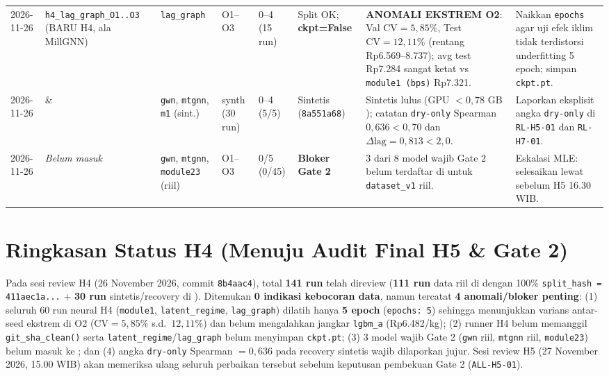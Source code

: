 \documentclass[11pt,a4paper]{article}
\begin{document}
\begin{longtable}{@{}C{1.3cm}L{2.5cm}L{1.4cm}C{0.9cm}C{0.9cm}L{1.4cm}L{3.2cm}L{2.5cm}@{}}
2026-11-26 & \texttt{h4\_lag\_graph\_O1..O3} (BARU H4, ala MillGNN) & \texttt{lag\_graph} & O1--O3 & 0--4 (15 run) & Split OK; \textbf{ckpt=False} & \textbf{ANOMALI EKSTREM O2}: Val $\text{CV}=5{,}85\%$, Test $\text{CV}=12{,}11\%$ (rentang Rp6.569--8.737); avg test Rp7.284 sangat ketat vs \texttt{module1 (bps)} Rp7.321. & Naikkan \texttt{epochs} agar uji efek iklim tidak terdistorsi underfitting 5 epoch; simpan \texttt{ckpt.pt}. \\
2026-11-26 &  \&  & \texttt{gwn}, \texttt{mtgnn}, \texttt{m1} (sint.) & synth (30 run) & 0--4 (5/5) & Sintetis (\texttt{8a551a68}) & Sintetis lulus (GPU $<0{,}78\text{ GB}$); catatan \texttt{dry-only} Spearman $0{,}636 < 0{,}70$ dan $\Delta\text{lag}=0{,}813 < 2{,}0$. & Laporkan eksplisit angka \texttt{dry-only} di \texttt{RL-H5-01} dan \texttt{RL-H7-01}. \\
2026-11-26 & \textit{Belum masuk } & \texttt{gwn}, \texttt{mtgnn}, \texttt{module23} (riil) & O1--O3 & 0/5 (0/45) & \textbf{Bloker Gate 2} & 3 dari 8 model wajib Gate 2 belum terdaftar di  untuk \texttt{dataset\_v1} riil. & Eskalasi MLE: selesaikan lewat  sebelum H5 16.30 WIB. \\
\bottomrule
\end{longtable}
\endgroup

\section{Ringkasan Status H4 (Menuju Audit Final H5 \& Gate 2)}
Pada sesi review H4 (26 November 2026, commit \texttt{8b4aac4}), total \textbf{141 run} telah
direview (\textbf{111 run} data riil di  dengan 100\%
\texttt{split\_hash = 411aec1a...} + \textbf{30 run} sintetis/recovery di ).
Ditemukan \textbf{0 indikasi kebocoran data}, namun tercatat \textbf{4 anomali/bloker penting}:
(1) seluruh 60 run neural H4 (\texttt{module1}, \texttt{latent\_regime}, \texttt{lag\_graph})
dilatih hanya \textbf{5 epoch} (\texttt{epochs: 5}) sehingga menunjukkan varians antar-seed
ekstrem di O2 ($\text{CV} = 5{,}85\%$ s.d.\ $12{,}11\%$) dan belum mengalahkan jangkar
\texttt{lgbm\_a} (Rp6.482/kg);
(2) runner H4 belum memanggil \texttt{git\_sha\_clean()} serta \texttt{latent\_regime}/\texttt{lag\_graph}
belum menyimpan \texttt{ckpt.pt};
(3) 3 model wajib Gate 2 (\texttt{gwn} riil, \texttt{mtgnn} riil, \texttt{module23}) belum masuk
ke ; dan
(4) angka \texttt{dry-only} Spearman $=0{,}636$ pada recovery sintetis wajib dilaporkan jujur.
Sesi review H5 (27 November 2026, 15.00 WIB) akan memeriksa ulang seluruh perbaikan tersebut
sebelum keputusan pembekuan Gate 2 (\texttt{ALL-H5-01}).
\end{document}
